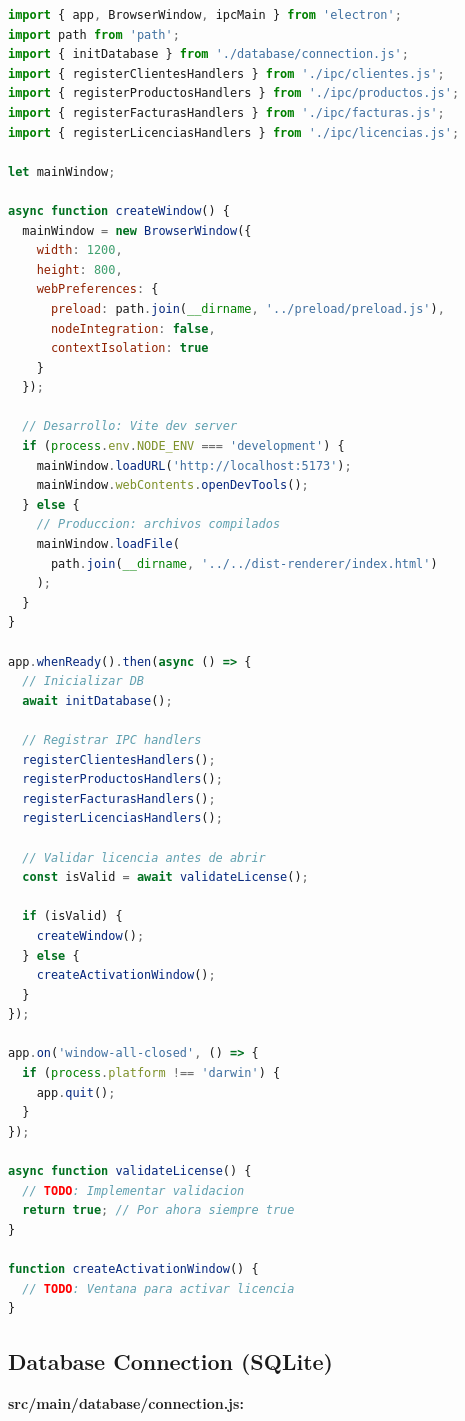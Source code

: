 \documentclass[11pt,a4paper]{article}
\begin{document}
\begin{lstlisting}[language=JavaScript]
import { app, BrowserWindow, ipcMain } from 'electron';
import path from 'path';
import { initDatabase } from './database/connection.js';
import { registerClientesHandlers } from './ipc/clientes.js';
import { registerProductosHandlers } from './ipc/productos.js';
import { registerFacturasHandlers } from './ipc/facturas.js';
import { registerLicenciasHandlers } from './ipc/licencias.js';

let mainWindow;

async function createWindow() {
  mainWindow = new BrowserWindow({
    width: 1200,
    height: 800,
    webPreferences: {
      preload: path.join(__dirname, '../preload/preload.js'),
      nodeIntegration: false,
      contextIsolation: true
    }
  });

  // Desarrollo: Vite dev server
  if (process.env.NODE_ENV === 'development') {
    mainWindow.loadURL('http://localhost:5173');
    mainWindow.webContents.openDevTools();
  } else {
    // Produccion: archivos compilados
    mainWindow.loadFile(
      path.join(__dirname, '../../dist-renderer/index.html')
    );
  }
}

app.whenReady().then(async () => {
  // Inicializar DB
  await initDatabase();
  
  // Registrar IPC handlers
  registerClientesHandlers();
  registerProductosHandlers();
  registerFacturasHandlers();
  registerLicenciasHandlers();
  
  // Validar licencia antes de abrir
  const isValid = await validateLicense();
  
  if (isValid) {
    createWindow();
  } else {
    createActivationWindow();
  }
});

app.on('window-all-closed', () => {
  if (process.platform !== 'darwin') {
    app.quit();
  }
});

async function validateLicense() {
  // TODO: Implementar validacion
  return true; // Por ahora siempre true
}

function createActivationWindow() {
  // TODO: Ventana para activar licencia
}
\end{lstlisting}

\newpage

\subsection{Database Connection (SQLite)}

\textbf{src/main/database/connection.js:}
\end{document}
